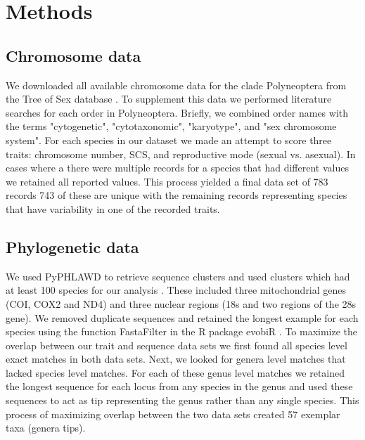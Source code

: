 
\section{Methods}

\subsection{Chromosome data}
We downloaded all available chromosome data for the clade Polyneoptera from the Tree of Sex database \citep{blackmon2016,TOS2014}.
To supplement this data we performed literature searches for each order in Polyneoptera.
Briefly, we combined order names with the terms "cytogenetic", "cytotaxonomic", "karyotype", and "sex chromosome system". %
For each species in our dataset we made an attempt to score three traits: chromosome number, SCS, and reproductive mode (sexual vs. asexual).
In cases where a there were multiple records for a species that had different values we retained all reported values.
This process yielded a final data set of 783 records 743 of these are unique with the remaining records representing species that have variability in one of the recorded traits. 


\subsection{Phylogenetic data}
We used PyPHLAWD to retrieve sequence clusters and used clusters which had at least 100 species for our analysis \citep{smith2018phyphlawd}. 
These included three mitochondrial genes (COI, COX2 and ND4) and three nuclear regions (18s and two regions of the 28s gene). 
We removed duplicate sequences and retained the longest example for each species using the function FastaFilter in the R package evobiR \citep{blackmon2015evobir}.
To maximize the overlap between our trait and sequence data sets we first found all species level exact matches in both data sets.
Next, we looked for genera level matches that lacked species level matches.
For each of these genus level matches we retained the longest sequence for each locus from any species in the genus and used these sequences to act as tip representing the genus rather than any single species. 
This process of maximizing overlap between the two data sets created 57 exemplar taxa (genera tips).

